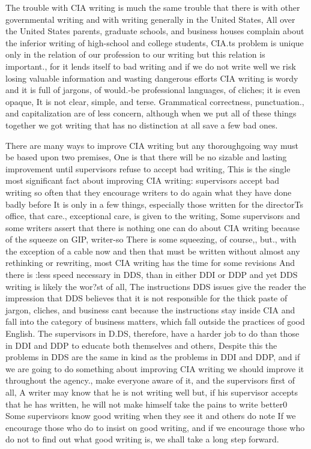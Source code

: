 \documentclass[
    oneside,
    11pt,
    draft
]{memoir}
\begin{document}
The trouble with CIA writing is much the same trouble that there is with other governmental writing and with writing generally in the United States, All over the United States parents, graduate schools, and business houses complain about the inferior writing of high-school and college students, CIA.ts problem is unique only in the relation of our profession to our writing but this relation is important., for it lends itself to bad writing and if we do not write well we risk losing valuable information and wasting dangerous efforts CIA writing is wordy and it is full of jargons, of would.-be professional languages, of cliches; it is even opaque, It is not clear, simple, and terse. Grammatical correctness, punctuation., and capitalization are of less concern, although when we put all of these things together we got writing that has no distinction at all save a few bad ones.

There are many ways to improve CIA writing but any thoroughgoing way must be based upon two premises, One is that there will be no sizable and lasting improvement until supervisors refuse to accept bad writing, This is the single most significant fact about improving CIA writing: supervisors accept bad writing so often that they encourage writers to do again what they have done badly before It is only in a few things, especially those written for the directorTs office, that care., exceptional care, is given to the writing, Some supervisors and some writers assert that there is nothing one can do about CIA writing because of the squeeze on GIP, writer-so There is some squeezing, of course,, but., with the exception of a cable now and then that must be written without almost any rethinking or rewriting, most CIA writing has the time for some revisions And there is :less speed necessary in DDS, than in either DDI or DDP and yet DDS writing is likely the wor?st of all, The instructions DDS issues give the reader the impression that DDS believes that it is not responsible for the thick paste of jargon, cliches, and business cant because the instructions stay inside CIA and fall into the category of business matters, which fall outside the practices of good English. The supervisors in D.DS, therefore, have a harder job to do than those in DDI and DDP to educate both themselves and others, Despite this the problems in DDS are the same in kind as the problems in DDI and DDP, and if we are going to do something about improving CIA writing we should improve it throughout the agency., make everyone aware of it, and the supervisors first of all, A writer may know that he is not writing well but, if his supervisor accepts that he has written, he will not make himself take the pains to write better0 Some supervisors know good
writing when they see it and others do note If we encourage those who do to insist on good writing, and if we encourage those who do not to find out what good writing is, we shall take a long step forward. 
\end{document}
